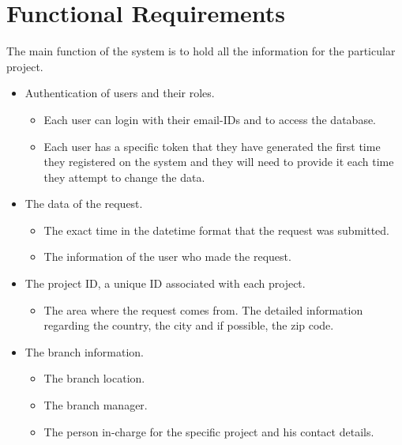 
\color{red}
\section*{Functional Requirements}
\color{black}


The main function of the system is to hold all the information for the particular project. 

\begin{itemize}
\item Authentication of users and their roles. 
\begin{itemize}
\item Each user can login with their email-IDs and to access the database.
\item Each user has a specific token that they have generated the first time they registered on the system and they will need to provide it each time they attempt to change the data.  
\end{itemize}

\item The data of the request.
\begin{itemize}
\item The exact time in the datetime format that the request was submitted. 
\item The information of the user who made the request.
\end{itemize}

\item The project ID, a unique ID associated with each project.
\begin{itemize}
\item The area where the request comes from. The detailed information regarding the country, the city and if possible, the zip code.
\end{itemize}

\item The branch information.
\begin{itemize}
    \item The branch location. 
    \item The branch manager.
    \item The person in-charge for the specific project and his contact details.
\end{itemize}


\end{itemize}
